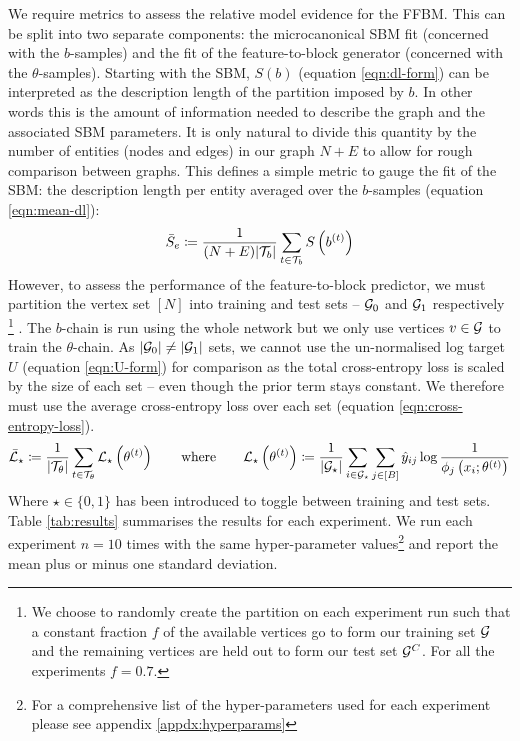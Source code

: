 We require metrics to assess the relative model evidence for the FFBM. This can be split into two separate components: the microcanonical SBM fit (concerned with the $b$-samples) and the fit of the feature-to-block generator (concerned with the $\theta$-samples). Starting with the SBM, $S(b)$ (equation \ref{eqn:dl-form}) can be interpreted as the description length of the partition imposed by $b$. In other words this is the amount of information needed to describe the graph and the associated SBM parameters. It is only natural to divide this quantity by the number of entities (nodes and edges) in our graph $N+E$ to allow for rough comparison between graphs. This defines a simple metric to gauge the fit of the SBM: the description length per entity averaged over the $b$-samples (equation \ref{eqn:mean-dl}):
%
\begin{equation}
	\bar{S}_e \coloneqq \frac{1}{(N+E) |\mathcal{T}_b|} \sum_{t\in \mathcal{T}_b} S \left( b^{(t)} \right)
	\label{eqn:mean-dl}
\end{equation}
%
However, to assess the performance of the feature-to-block predictor, we must partition the vertex set $[N]$ into training and test sets -- $\mathcal{G}_0$ and $\mathcal{G}_1$ respectively
\footnote{We choose to randomly create the partition on each experiment run such that a constant fraction $f$ of the available vertices go to form our training set $\mathcal{G}$ and the remaining vertices are held out to form our test set $\mathcal{G}^C$. For all the experiments $f=0.7$.}
. The $b$-chain is run using the whole network but we only use vertices $v \in \mathcal{G}$ to train the $\theta$-chain. As $|\mathcal{G}_0| \neq |\mathcal{G}_1|$ sets, we cannot use the un-normalised log target $U$ (equation \ref{eqn:U-form}) for comparison as the total cross-entropy loss is scaled by the size of each set -- even though the prior term stays constant. We therefore must use the average cross-entropy loss over each set (equation \ref{eqn:cross-entropy-loss}).
%
\begin{equation}
	\bar{\mathcal{L}}_\star \coloneqq \frac{1}{|\mathcal{T}_\theta|} \sum_{t \in \mathcal{T}_\theta} \mathcal{L}_\star \left( \theta^{(t)} \right)
	\qquad \textrm{where} \qquad
	\mathcal{L}_\star \left( \theta^{(t)} \right) \coloneqq \frac{1}{|\mathcal{G}_\star|} \sum_{i \in \mathcal{G}_\star}\sum_{j \in [B]} \hat{y}_{ij} \log \frac{1}{\phi_j \left(x_i; \theta^{(t)} \right)}
	\label{eqn:cross-entropy-loss}
\end{equation}
%
Where $\star \in \{0, 1\}$ has been introduced to toggle between training and test sets. Table \ref{tab:results} summarises the results for each experiment. We run each experiment $n=10$ times with the same hyper-parameter values\footnote{For a comprehensive list of the hyper-parameters used for each experiment please see appendix \ref{appdx:hyperparams}} and report the mean plus or minus one standard deviation.


